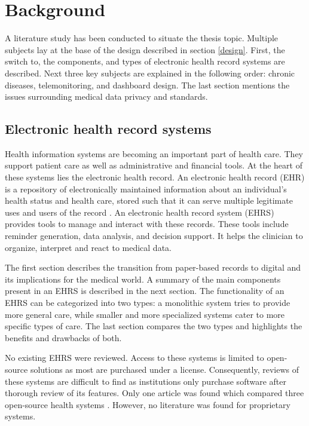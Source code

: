 \section{Background} \label{background}

A literature study has been conducted to situate the thesis topic. Multiple subjects lay at the base of the design described in section \ref{design}. First, the switch to, the components, and types of electronic health record systems are described. Next three key subjects are explained in the following order: chronic diseases, telemonitoring, and dashboard design. The last section mentions the issues surrounding medical data privacy and standards. 

    \subsection{Electronic health record systems}

    Health information systems are becoming an important part of health care. They support patient care as well as administrative and financial tools. At the heart of these systems lies the electronic health record. An electronic health record (EHR) is a repository of electronically maintained information about an individual's health status and health care, stored such that it can serve multiple legitimate uses and users of the record \cite{biomedical_informatics}. An electronic health record system (EHRS) provides tools to manage and interact with these records. These tools include reminder generation, data analysis, and decision support. It helps the clinician to organize, interpret and react to medical data.

    The first section describes the transition from paper-based records to digital and its implications for the medical world. A summary of the main components present in an EHRS is described in the next section. The functionality of an EHRS can be categorized into two types: a monolithic system tries to provide more general care, while smaller and more specialized systems cater to more specific types of care. The last section compares the two types and highlights the benefits and drawbacks of both.

    No existing EHRS were reviewed. Access to these systems is limited to open-source solutions as most are purchased under a license. Consequently, reviews of these systems are difficult to find as institutions only purchase software after thorough review of its features. Only one article was found which compared three open-source health systems \cite{de2012overview}. However, no literature was found for proprietary systems.

